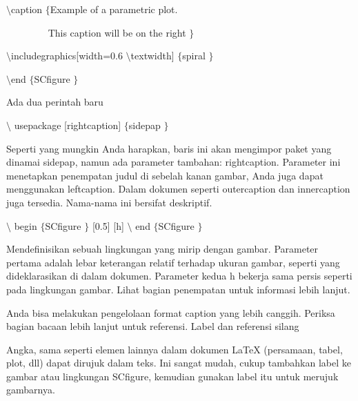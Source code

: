\vspace{12pt}
\noindent
 $  \setminus $caption $  \{  $Example of a parametric plot. \par
\noindent
  \par
\noindent
~~~~~~~~ This caption will be on the right $  \}  $ \par
\vspace{12pt}
\noindent
 $  \setminus $includegraphics[width=0.6 $  \setminus $textwidth] $  \{  $spiral $  \}  $ \par
\vspace{12pt}
\noindent
 $  \setminus $end $  \{  $SCfigure $  \}  $ \par
\vspace{16pt}
\vspace{16pt}
\noindent
Ada dua perintah baru \par
\vspace{12pt}
\noindent
 $  \setminus $ usepackage [rightcaption]  $  \{  $sidepap $  \}  $ \par
\noindent
Seperti yang mungkin Anda harapkan, baris ini akan mengimpor paket yang dinamai sidepap, namun ada parameter tambahan: rightcaption. Parameter ini menetapkan penempatan judul di sebelah kanan gambar, Anda juga dapat menggunakan leftcaption. Dalam dokumen seperti outercaption dan innercaption juga tersedia. Nama-nama ini bersifat deskriptif. \par
\vspace{12pt}
\noindent
 $  \setminus $ begin  $  \{  $SCfigure $  \}  $ [0.5] [h]  $  \setminus $ end  $  \{  $SCfigure $  \}  $ \par
\noindent
Mendefinisikan sebuah lingkungan yang mirip dengan gambar. Parameter pertama adalah lebar keterangan relatif terhadap ukuran gambar, seperti yang dideklarasikan di dalam dokumen. Parameter kedua h bekerja sama persis seperti pada lingkungan gambar. Lihat bagian penempatan untuk informasi lebih lanjut. \par
\vspace{12pt}
\noindent
Anda bisa melakukan pengelolaan format caption yang lebih canggih. Periksa bagian bacaan lebih lanjut untuk referensi. Label dan referensi silang \par
\vspace{12pt}
\noindent
Angka, sama seperti elemen lainnya dalam dokumen LaTeX (persamaan, tabel, plot, dll) dapat dirujuk dalam teks. Ini sangat mudah, cukup tambahkan label ke gambar atau lingkungan SCfigure, kemudian gunakan label itu untuk merujuk gambarnya. \par
